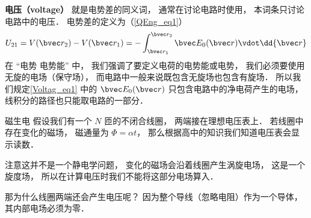 

\textbf{电压（voltage）} 就是电势差的同义词， 通常在讨论电路时使用， 本词条只讨论电路中的电压． 电势差的定义为（\autoref{QEng_eq1}）
\begin{equation}\label{Voltag_eq1}
U_{21} = V(\bvec r_2) - V(\bvec r_1) = - \int_{\bvec r_1}^{\bvec r_2} \bvec E_0(\bvec r) \vdot \dd{\bvec r}
\end{equation}
在 “电势 电势能” 中， 我们强调了要定义电荷的电势能或电势， 我们必须要使用无旋的电场（保守场）， 而电路中一般来说既包含无旋场也包含有旋场． 所以我们规定\autoref{Voltag_eq1} 中的 $\bvec E_0(\bvec r)$ 只包含电路中的净电荷产生的电场， 线积分的路径也只能取电路的一部分．

\begin{exercise}{磁生电}
假设我们有一个 $N$ 匝的不闭合线圈， 两端接在理想电压表上． 若线圈中存在变化的磁场， 磁通量为 $\Phi = \alpha t$， 那么根据高中的知识我们知道电压表会显示读数．

注意这并不是一个静电学问题， 变化的磁场会沿着线圈产生涡旋电场， 这是一个旋度场， 所以在计算电压时我们不能将这部分电场算入．

那为什么线圈两端还会产生电压呢？ 因为整个导线（忽略电阻）作为一个导体， 其内部电场必须为零．
\end{exercise}